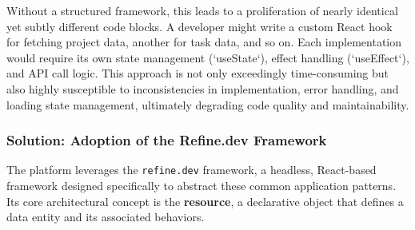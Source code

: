 Without a structured framework, this leads to a proliferation of nearly identical yet subtly different code blocks. A developer might write a custom React hook for fetching project data, another for task data, and so on. Each implementation would require its own state management (`useState`), effect handling (`useEffect`), and API call logic. This approach is not only exceedingly time-consuming but also highly susceptible to inconsistencies in implementation, error handling, and loading state management, ultimately degrading code quality and maintainability.

\subsubsection{Solution: Adoption of the Refine.dev Framework}
The platform leverages the \texttt{refine.dev} framework, a headless, React-based framework designed specifically to abstract these common application patterns. Its core architectural concept is the \textbf{resource}, a declarative object that defines a data entity and its associated behaviors.

